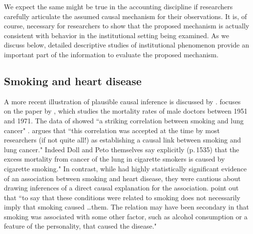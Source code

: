 \documentclass[12pt,reqno,titlepage]{amsart}
\theoremstyle{definition}
\begin{document}
\begin{doublespace}
We expect the same might be true in the accounting discipline if researchers carefully articulate the assumed causal mechanism for their observations.
It is, of course, necessary for researchers to show that the proposed mechanism is actually consistent with behavior in the institutional setting being examined.
As we discuss below, detailed descriptive studies of institutional phenomenon provide an important part of the information to evaluate the proposed mechanism. 

\subsection{Smoking and heart disease}
A more recent illustration of plausible causal inference is discussed by \citet{Gillies2011-GILTRT-3}.
\citet{Gillies2011-GILTRT-3} focuses on the paper by \citet{Doll:1976aa}, which studies the mortality rates of male doctors between 1951 and 1971. 
The data of \citet{Doll:1976aa} showed ``a striking correlation between smoking and lung cancer" \citep[p. 111]{Gillies2011-GILTRT-3}.
 \citet{Gillies2011-GILTRT-3} argues that ``this correlation was accepted at the time by most researchers (if not quite all!) as establishing a causal link between smoking and lung cancer."
Indeed Doll and Peto themselves say explicitly (p.\,1535) that the excess mortality from cancer of the lung in cigarette smokers is caused by cigarette smoking."
In contrast, while \citet{Doll:1976aa} had highly statistically significant evidence of an association between smoking and heart disease, they were cautious about drawing inferences of a direct causal explanation for the association. 
\citet[p. 1528]{Doll:1976aa} point out that ``to say that these conditions were related to smoking does not necessarily imply that smoking caused \dots them. The relation may have been secondary in that smoking was associated with some other factor, such as alcohol consumption or a feature of the personality, that caused the disease."
 

\end{doublespace}
\end{document}
